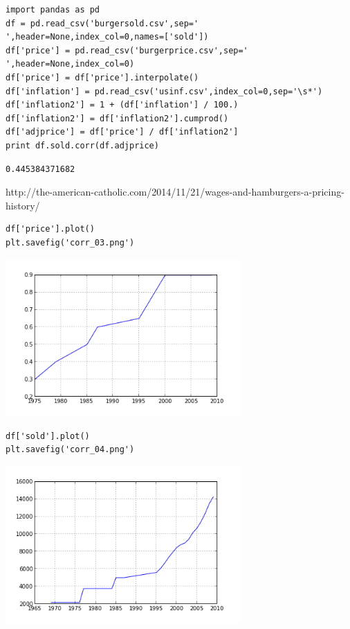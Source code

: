 \documentclass[12pt,fleqn]{article}\usepackage{../common}
\begin{document}
\begin{verbatim}
import pandas as pd
df = pd.read_csv('burgersold.csv',sep=' ',header=None,index_col=0,names=['sold'])
df['price'] = pd.read_csv('burgerprice.csv',sep=' ',header=None,index_col=0)
df['price'] = df['price'].interpolate()
df['inflation'] = pd.read_csv('usinf.csv',index_col=0,sep='\s*')
df['inflation2'] = 1 + (df['inflation'] / 100.)
df['inflation2'] = df['inflation2'].cumprod()
df['adjprice'] = df['price'] / df['inflation2']
print df.sold.corr(df.adjprice)
\end{verbatim}

\begin{verbatim}
0.445384371682
\end{verbatim}

http://the-american-catholic.com/2014/11/21/wages-and-hamburgers-a-pricing-history/

\begin{verbatim}
df['price'].plot()
plt.savefig('corr_03.png')
\end{verbatim}

\includegraphics[height=6cm]{corr_03.png}


\begin{verbatim}
df['sold'].plot()
plt.savefig('corr_04.png')
\end{verbatim}

\includegraphics[height=6cm]{corr_04.png}
\end{document}
